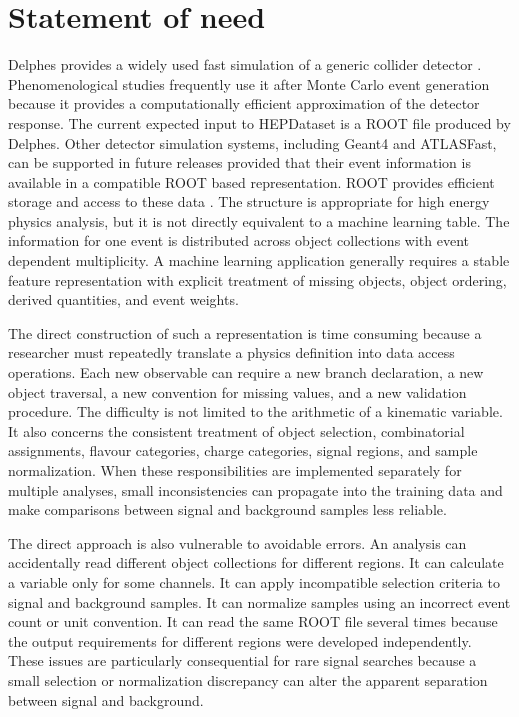 \documentclass[11pt,a4paper]{article}
\begin{document}
\section{Statement of need}

Delphes provides a widely used fast simulation of a generic collider
detector \citep{delphes}. Phenomenological studies frequently use it after
Monte Carlo event generation because it provides a computationally efficient
approximation of the detector response. The current expected input to HEPDataset
is a ROOT file produced by Delphes. Other detector simulation systems,
including Geant4 and ATLASFast, can be supported in future releases provided
that their event information is available in a compatible ROOT based
representation. ROOT provides efficient storage and access to these data
\citep{root}. The structure is appropriate for high energy physics analysis, but
it is not directly equivalent to a machine learning table. The information for
one event is distributed across object collections with event dependent
multiplicity. A machine learning application generally requires a stable
feature representation with explicit treatment of missing objects, object
ordering, derived quantities, and event weights.

The direct construction of such a representation is time consuming because a
researcher must repeatedly translate a physics definition into data access
operations. Each new observable can require a new branch declaration, a new
object traversal, a new convention for missing values, and a new validation
procedure. The difficulty is not limited to the arithmetic of a kinematic
variable. It also concerns the consistent treatment of object selection,
combinatorial assignments, flavour categories, charge categories, signal
regions, and sample normalization. When these responsibilities are implemented
separately for multiple analyses, small inconsistencies can propagate into the
training data and make comparisons between signal and background samples less
reliable.

The direct approach is also vulnerable to avoidable errors. An analysis can
accidentally read different object collections for different regions. It can
calculate a variable only for some channels. It can apply incompatible selection
criteria to signal and background samples. It can normalize samples using an
incorrect event count or unit convention. It can read the same ROOT file several
times because the output requirements for different regions were developed
independently. These issues are particularly consequential for rare signal
searches because a small selection or normalization discrepancy can alter the
apparent separation between signal and background.
\end{document}
